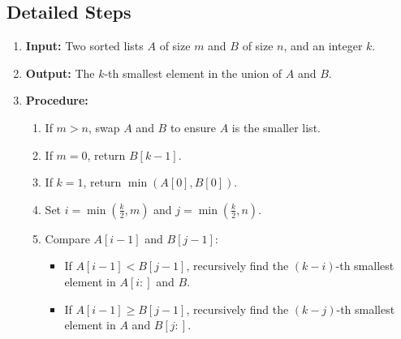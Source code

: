 \documentclass{article}
\begin{document}
\begin{itemize}
\section*{Detailed Steps}
\begin{enumerate}
    \item \textbf{Input:} Two sorted lists $A$ of size $m$ and $B$ of size $n$, and an integer $k$.
    \item \textbf{Output:} The $k$-th smallest element in the union of $A$ and $B$.
    \item \textbf{Procedure:}
    \begin{enumerate}
        \item If $m > n$, swap $A$ and $B$ to ensure $A$ is the smaller list.
        \item If $m = 0$, return $B[k-1]$.
        \item If $k = 1$, return $\min(A[0], B[0])$.
        \item Set $i = \min(\frac{k}{2}, m)$ and $j = \min(\frac{k}{2}, n)$.
        \item Compare $A[i-1]$ and $B[j-1]$:
        \begin{itemize}
            \item If $A[i-1] < B[j-1]$, recursively find the $(k - i)$-th smallest element in $A[i:]$ and $B$.
            \item If $A[i-1] \geq B[j-1]$, recursively find the $(k - j)$-th smallest element in $A$ and $B[j:]$.
        \end{itemize}
    \end{enumerate}
\end{enumerate}


\end{itemize}
\end{document}
